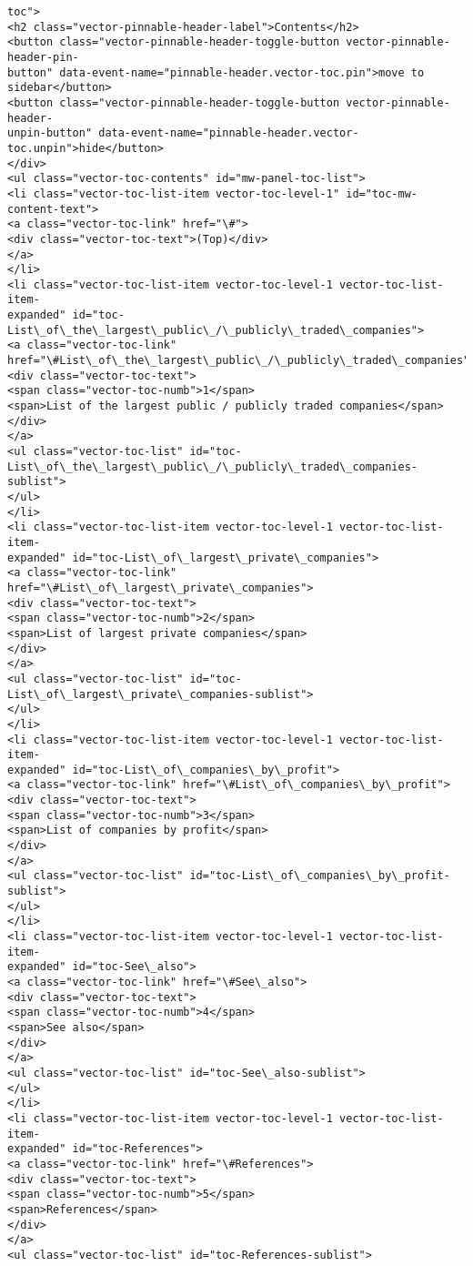 \documentclass[11pt]{article}
\begin{document}
\begin{Verbatim}[commandchars=\\\{\}]
toc">
<h2 class="vector-pinnable-header-label">Contents</h2>
<button class="vector-pinnable-header-toggle-button vector-pinnable-header-pin-
button" data-event-name="pinnable-header.vector-toc.pin">move to
sidebar</button>
<button class="vector-pinnable-header-toggle-button vector-pinnable-header-
unpin-button" data-event-name="pinnable-header.vector-toc.unpin">hide</button>
</div>
<ul class="vector-toc-contents" id="mw-panel-toc-list">
<li class="vector-toc-list-item vector-toc-level-1" id="toc-mw-content-text">
<a class="vector-toc-link" href="\#">
<div class="vector-toc-text">(Top)</div>
</a>
</li>
<li class="vector-toc-list-item vector-toc-level-1 vector-toc-list-item-
expanded" id="toc-List\_of\_the\_largest\_public\_/\_publicly\_traded\_companies">
<a class="vector-toc-link"
href="\#List\_of\_the\_largest\_public\_/\_publicly\_traded\_companies">
<div class="vector-toc-text">
<span class="vector-toc-numb">1</span>
<span>List of the largest public / publicly traded companies</span>
</div>
</a>
<ul class="vector-toc-list" id="toc-
List\_of\_the\_largest\_public\_/\_publicly\_traded\_companies-sublist">
</ul>
</li>
<li class="vector-toc-list-item vector-toc-level-1 vector-toc-list-item-
expanded" id="toc-List\_of\_largest\_private\_companies">
<a class="vector-toc-link" href="\#List\_of\_largest\_private\_companies">
<div class="vector-toc-text">
<span class="vector-toc-numb">2</span>
<span>List of largest private companies</span>
</div>
</a>
<ul class="vector-toc-list" id="toc-List\_of\_largest\_private\_companies-sublist">
</ul>
</li>
<li class="vector-toc-list-item vector-toc-level-1 vector-toc-list-item-
expanded" id="toc-List\_of\_companies\_by\_profit">
<a class="vector-toc-link" href="\#List\_of\_companies\_by\_profit">
<div class="vector-toc-text">
<span class="vector-toc-numb">3</span>
<span>List of companies by profit</span>
</div>
</a>
<ul class="vector-toc-list" id="toc-List\_of\_companies\_by\_profit-sublist">
</ul>
</li>
<li class="vector-toc-list-item vector-toc-level-1 vector-toc-list-item-
expanded" id="toc-See\_also">
<a class="vector-toc-link" href="\#See\_also">
<div class="vector-toc-text">
<span class="vector-toc-numb">4</span>
<span>See also</span>
</div>
</a>
<ul class="vector-toc-list" id="toc-See\_also-sublist">
</ul>
</li>
<li class="vector-toc-list-item vector-toc-level-1 vector-toc-list-item-
expanded" id="toc-References">
<a class="vector-toc-link" href="\#References">
<div class="vector-toc-text">
<span class="vector-toc-numb">5</span>
<span>References</span>
</div>
</a>
<ul class="vector-toc-list" id="toc-References-sublist">

\end{Verbatim}
\end{document}
